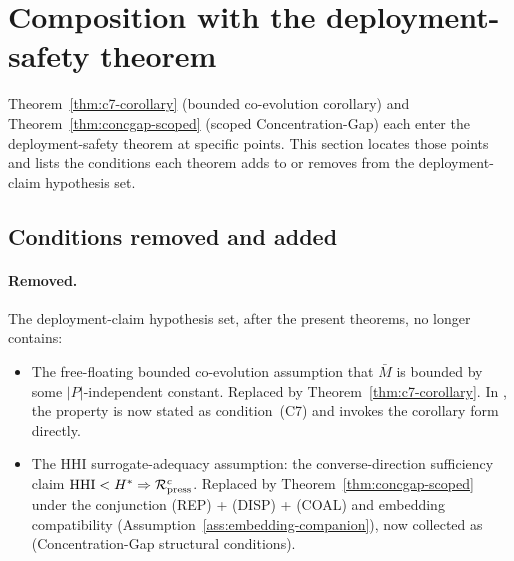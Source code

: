 \section{Composition with the deployment-safety theorem}
\label{sec:composition}

Theorem~\ref{thm:c7-corollary} (bounded co-evolution corollary)
and Theorem~\ref{thm:concgap-scoped} (scoped Concentration-Gap)
each enter the deployment-safety theorem
\citep[Theorem~1]{lasser2026paper10} at specific points.  This
section locates those points and lists the conditions each
theorem adds to or removes from the deployment-claim hypothesis
set.

\subsection{Conditions removed and added}

\paragraph{Removed.}  The deployment-claim hypothesis set, after
the present theorems, no longer contains:
\begin{itemize}
\item The free-floating bounded co-evolution assumption that
  $\bar{M}$ is bounded by some $|P|$-independent constant.
  Replaced by Theorem~\ref{thm:c7-corollary}.  In
  \citep[Deployment Safety]{lasser2026paper10}, the property is
  now stated as condition~(C7) and invokes the corollary form
  directly.
\item The HHI surrogate-adequacy assumption: the
  converse-direction sufficiency claim $\mathrm{HHI} < H^*
  \Rightarrow \mathcal{R}_{\mathrm{press}}^c$. Replaced by
  Theorem~\ref{thm:concgap-scoped} under the conjunction (REP) +
  (DISP) + (COAL) and embedding compatibility
  (Assumption~\ref{ass:embedding-companion}), now collected as
  \citep[Assumption~1]{lasser2026paper10} (Concentration-Gap
  structural conditions).
\end{itemize}

